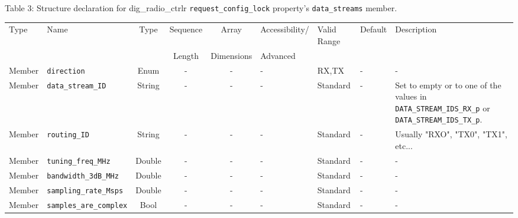 \documentclass{article}
\def\comp{dig\_radio\_ctrlr}
\begin{document}
\begin{landscape}
	\noindent Table \hypertarget{tab3}{3}: Structure declaration for \comp{} \verb+request_config_lock+ property's \verb+data_streams+ member. \\
	\begin{scriptsize}
		\noindent\begin{longtable}{|p{1.8cm}|p{3.6cm}|c|c|c|p{2cm}|p{1.7cm}|p{1.0cm}|p{7.37cm}|}
			\hline
			\rowcolor{blue}
			Type         & Name                                & Type & Sequence & Array      & Accessibility/ & Valid Range  & Default & Description                                                                                                                                                                                                                 \\
			\rowcolor{blue}
			             &                                     &      & Length   & Dimensions & Advanced       &              &         &                                                                                                                                                                                                                             \\
			\hline
			Member       & \verb+direction+                    & Enum  & -       & -          & -              & RX,TX        & -       & - \\
			\hline
			Member       & \verb+data_stream_ID+               & String& -       & -          & -              & Standard     & -       & Set to empty or to one of the values in \verb+DATA_STREAM_IDS_RX_p+ or \verb+DATA_STREAM_IDS_TX_p+. \\
			\hline
			Member       & \verb+routing_ID+                   & String& -       & -          & -              & Standard     & -       & Usually "RXO", "TX0", "TX1", etc... \\
			\hline
			Member       & \verb+tuning_freq_MHz+              & Double & -       & -          & -              & Standard     & -       & - \\
			\hline
			Member       & \verb+bandwidth_3dB_MHz+              & Double & -       & -          & -              & Standard     & -       & - \\
			\hline
			Member       & \verb+sampling_rate_Msps+             & Double & -       & -          & -              & Standard     & -       & - \\
			\hline
			Member       & \verb+samples_are_complex+            & Bool   & -       & -          & -              & Standard     & -       & - \\

\end{longtable}
\end{scriptsize}
\end{landscape}
\end{document}
